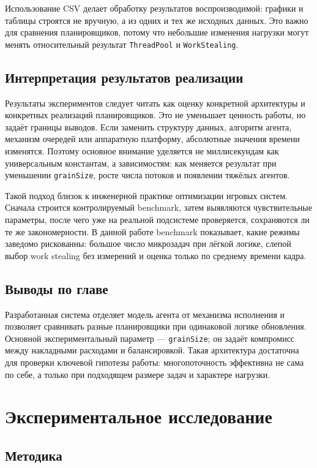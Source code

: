 \documentclass[14pt,a4paper,oneside]{extreport}
\begin{document}
Использование CSV делает обработку результатов воспроизводимой: графики и таблицы строятся не вручную, а из одних и тех же исходных данных. Это важно для сравнения планировщиков, потому что небольшие изменения нагрузки могут менять относительный результат \texttt{ThreadPool} и \texttt{WorkStealing}.

\section{Интерпретация результатов реализации}

Результаты экспериментов следует читать как оценку конкретной архитектуры и конкретных реализаций планировщиков. Это не уменьшает ценность работы, но задаёт границы выводов. Если заменить структуру данных, алгоритм агента, механизм очередей или аппаратную платформу, абсолютные значения времени изменятся. Поэтому основное внимание уделяется не миллисекундам как универсальным константам, а зависимостям: как меняется результат при уменьшении \texttt{grainSize}, росте числа потоков и появлении тяжёлых агентов.

Такой подход близок к инженерной практике оптимизации игровых систем. Сначала строится контролируемый benchmark, затем выявляются чувствительные параметры, после чего уже на реальной подсистеме проверяется, сохраняются ли те же закономерности. В данной работе benchmark показывает, какие режимы заведомо рискованны: большое число микрозадач при лёгкой логике, слепой выбор work stealing без измерений и оценка только по среднему времени кадра.

\section{Выводы по главе}

Разработанная система отделяет модель агента от механизма исполнения и позволяет сравнивать разные планировщики при одинаковой логике обновления. Основной экспериментальный параметр --- \texttt{grainSize}; он задаёт компромисс между накладными расходами и балансировкой. Такая архитектура достаточна для проверки ключевой гипотезы работы: многопоточность эффективна не сама по себе, а только при подходящем размере задач и характере нагрузки.

\chapter{Экспериментальное исследование}

\section{Методика}
\end{document}
